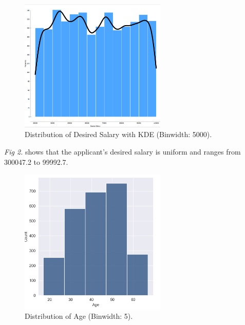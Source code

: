 \documentclass[journal]{IEEEtai}
\begin{document}
\begin{figure}
\centerline{\includegraphics[width=16.5pc]{figures/desiredSalaryN.png}}
\caption{Distribution of Desired Salary with KDE (Binwidth: 5000).}
\end{figure}


{\it Fig 2.} shows that the applicant's desired salary is uniform and ranges from 300047.2 to 99992.7.



\begin{figure}[h]
\centerline{\includegraphics[width=16.5pc]{figures/age-distribution.png}}
\caption{Distribution of Age (Binwidth: 5).}
\end{figure}
\end{document}
